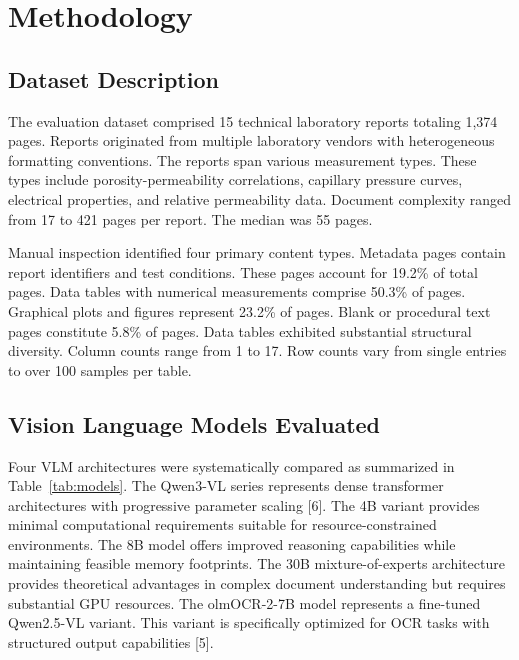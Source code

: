 \documentclass{svproc}
\begin{document}
\section{Methodology}

\subsection{Dataset Description}

The evaluation dataset comprised 15 technical laboratory reports totaling 1,374 pages. Reports originated from multiple laboratory vendors with heterogeneous formatting conventions. The reports span various measurement types. These types include porosity-permeability correlations, capillary pressure curves, electrical properties, and relative permeability data. Document complexity ranged from 17 to 421 pages per report. The median was 55 pages.

Manual inspection identified four primary content types. Metadata pages contain report identifiers and test conditions. These pages account for 19.2\% of total pages. Data tables with numerical measurements comprise 50.3\% of pages. Graphical plots and figures represent 23.2\% of pages. Blank or procedural text pages constitute 5.8\% of pages. Data tables exhibited substantial structural diversity. Column counts range from 1 to 17. Row counts vary from single entries to over 100 samples per table.

\subsection{Vision Language Models Evaluated}

Four VLM architectures were systematically compared as summarized in Table~\ref{tab:models}. The Qwen3-VL series represents dense transformer architectures with progressive parameter scaling [6]. The 4B variant provides minimal computational requirements suitable for resource-constrained environments. The 8B model offers improved reasoning capabilities while maintaining feasible memory footprints. The 30B mixture-of-experts architecture provides theoretical advantages in complex document understanding but requires substantial GPU resources. The olmOCR-2-7B model represents a fine-tuned Qwen2.5-VL variant. This variant is specifically optimized for OCR tasks with structured output capabilities [5].
\end{document}
